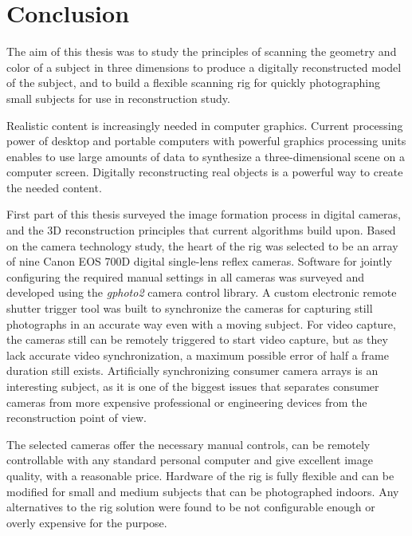 \section{Conclusion} \label{sec:conclusion} %

The aim of this thesis was to study the principles of scanning the geometry and color of a subject in three dimensions to produce a digitally reconstructed model of the subject, and to build a flexible scanning rig for quickly photographing small subjects for use in reconstruction study.

Realistic content is increasingly needed in computer graphics.
Current processing power of desktop and portable computers with powerful graphics processing units enables to use large amounts of data to synthesize a three-dimensional scene on a computer screen.
Digitally reconstructing real objects is a powerful way to create the needed content.

First part of this thesis surveyed the image formation process in digital cameras, and the 3D reconstruction principles that current algorithms build upon.
Based on the camera technology study, the heart of the rig was selected to be an array of nine Canon EOS 700D digital single-lens reflex cameras.
Software for jointly configuring the required manual settings in all cameras was surveyed and developed using the \emph{gphoto2} camera control library.
A custom electronic remote shutter trigger tool was built to synchronize the cameras for capturing still photographs in an accurate way even with a moving subject.
For video capture, the cameras still can be remotely triggered to start video capture, but as they lack accurate video synchronization, a maximum possible error of half a frame duration still exists.
Artificially synchronizing consumer camera arrays is an interesting subject, as it is one of the biggest issues that separates consumer cameras from more expensive professional or engineering devices from the reconstruction point of view.

The selected cameras offer the necessary manual controls, can be remotely controllable with any standard personal computer and give excellent image quality, with a reasonable price.
Hardware of the rig is fully flexible and can be modified for small and medium subjects that can be photographed indoors.
Any alternatives to the rig solution were found to be not configurable enough or overly expensive for the purpose.

